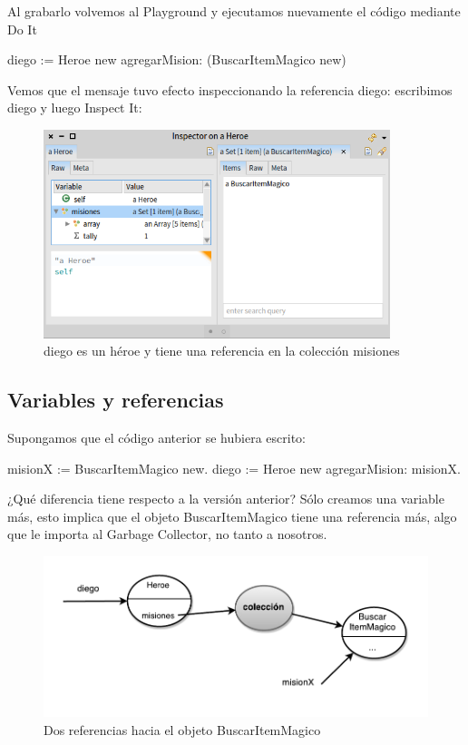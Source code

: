 \documentclass[a4paper,12pt]{book}
\begin{document}
\vspace{\baselineskip}
Al grabarlo volvemos al Playground y ejecutamos nuevamente el código mediante Do It

\begin{code}
diego := Heroe new
  agregarMision: (BuscarItemMagico new)
\end{code}

\vspace{\baselineskip}
Vemos que el mensaje tuvo efecto inspeccionando la referencia diego: escribimos diego y luego Inspect It:

\begin{figure}[h!]
    \centering	
    \includegraphics[width=0.9\textwidth]{images/14_coleccion_inicial.png}
    \caption{diego es un héroe y tiene una referencia en la colección misiones}
\end{figure}
\FloatBarrier

\subsection{Variables y referencias}

Supongamos que el código anterior se hubiera escrito:

\begin{code}
misionX := BuscarItemMagico new.
diego := Heroe new
  agregarMision: misionX.
\end{code}

¿Qué diferencia tiene respecto a la versión anterior? Sólo creamos una variable más, esto implica
que el objeto BuscarItemMagico tiene una referencia más, algo que le importa al Garbage Collector,
no tanto a nosotros.

\begin{figure}[h!]
    \centering
    \includegraphics[width=1\textwidth]{images/30_Referencias_colecciones.pdf}
    \caption{Dos referencias hacia el objeto BuscarItemMagico}
\end{figure}
\FloatBarrier
\end{document}
